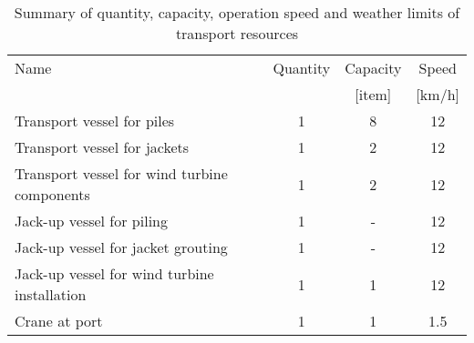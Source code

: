 \begin{table}
\label{tab:input}
\begin{tabular}{lccc}
\hline 
Name & Quantity & Capacity & Speed \\
& & [item] & [km/h] &  \\ 
\hline 
Transport vessel for piles & 1 & 8 & 12 \\ 
Transport vessel for jackets & 1 & 2 & 12 \\ 
Transport vessel for wind turbine components & 1 & 2 & 12 \\ 
Jack-up vessel for piling & 1 & - & 12\\
Jack-up vessel for jacket grouting & 1 & - & 12\\
Jack-up vessel for wind turbine installation & 1 & 1 & 12 \\
Crane at port & 1 & 1 & 1.5 \\
\hline 
\end{tabular}

\caption{Summary of quantity, capacity, operation speed and weather limits of transport resources}
\end{table}
